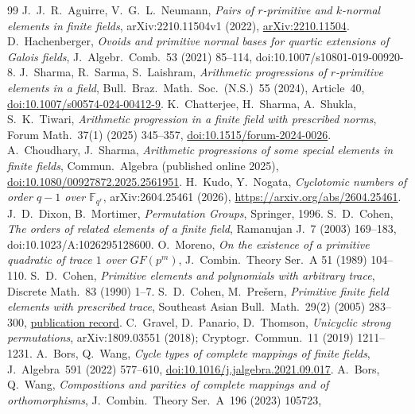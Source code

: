 \documentclass[11pt]{article}
\begin{document}
\begin{thebibliography}{99}
 J.~J.~R.~Aguirre, V.~G.~L.~Neumann,
\emph{Pairs of $r$-primitive and $k$-normal elements in finite fields},
arXiv:2210.11504v1 (2022),
\href{https://arxiv.org/abs/2210.11504}{arXiv:2210.11504}.
 D.~Hachenberger,
\emph{Ovoids and primitive normal bases for quartic extensions of Galois fields},
J.~Algebr.~Comb.~53 (2021) 85--114,
doi:10.1007/s10801-019-00920-8.
 J.~Sharma, R.~Sarma, S.~Laishram,
\emph{Arithmetic progressions of $r$-primitive elements in a field},
Bull.~Braz.~Math.~Soc.~(N.S.)~55 (2024), Article~40,
\href{https://doi.org/10.1007/s00574-024-00412-9}{doi:10.1007/s00574-024-00412-9}.
 K.~Chatterjee, H.~Sharma, A.~Shukla, S.~K.~Tiwari,
\emph{Arithmetic progression in a finite field with prescribed norms},
Forum Math.~37(1) (2025) 345--357,
\href{https://doi.org/10.1515/forum-2024-0026}{doi:10.1515/forum-2024-0026}.
 A.~Choudhary, J.~Sharma,
\emph{Arithmetic progressions of some special elements in finite fields},
Commun.~Algebra (published online 2025),
\href{https://doi.org/10.1080/00927872.2025.2561951}{doi:10.1080/00927872.2025.2561951}.
 H.~Kudo, Y.~Nogata, \emph{Cyclotomic numbers of order
$q-1$ over $\mathbb F_{q^r}$}, arXiv:2604.25461 (2026),
\url{https://arxiv.org/abs/2604.25461}.
 J.~D.~Dixon, B.~Mortimer, \emph{Permutation Groups}, Springer, 1996.
 S.~D.~Cohen, \emph{The orders of related elements of a finite field}, Ramanujan J.~7 (2003) 169--183, doi:10.1023/A:1026295128600.
 O.~Moreno, \emph{On the existence of a primitive quadratic of trace $1$ over $GF(p^m)$}, J.~Combin.~Theory Ser.~A 51 (1989) 104--110.
 S.~D.~Cohen, \emph{Primitive elements and polynomials with arbitrary trace}, Discrete Math.~83 (1990) 1--7.
 S.~D.~Cohen, M.~Pre\v{s}ern,
\emph{Primitive finite field elements with prescribed trace},
Southeast Asian Bull.~Math.~29(2) (2005) 283--300,
\href{https://researchportal.hw.ac.uk/en/publications/primitive-finite-field-elements-with-prescribed-trace/}{publication record}.
 C.~Gravel, D.~Panario, D.~Thomson, \emph{Unicyclic strong permutations}, arXiv:1809.03551 (2018); Cryptogr.~Commun.~11 (2019) 1211--1231.
 A.~Bors, Q.~Wang, \emph{Cycle types of complete mappings of finite fields},
J.~Algebra~591 (2022) 577--610,
\href{https://doi.org/10.1016/j.jalgebra.2021.09.017}{doi:10.1016/j.jalgebra.2021.09.017}.
 A.~Bors, Q.~Wang, \emph{Compositions and parities of complete mappings and of orthomorphisms},
J.~Combin.~Theory Ser.~A~196 (2023) 105723,

\end{thebibliography}
\end{document}
